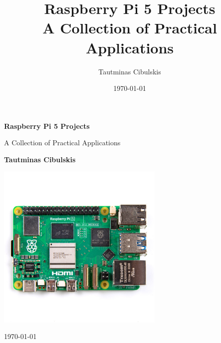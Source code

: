 \documentclass[a4paper,12pt]{article}
\title{\textbf{Raspberry Pi 5 Projects} \\ \Large A Collection of Practical Applications}
\author{Tautminas Cibulskis}
\date{\today}
\begin{document}
\begin{titlepage}
\centering
\vspace*{2cm}
{\Huge \textbf{Raspberry Pi 5 Projects} \par}
\vspace{0.5cm}
{\Large A Collection of Practical Applications\par}
\vspace{2cm}
{\Large \textbf{Tautminas Cibulskis} \par}
\vspace{1.5cm}
\includegraphics[width=0.6\textwidth]{images/raspberry-pi-5.jpg}
\vfill
{\large \today\par}
\end{titlepage}

\renewcommand{\cftsecleader}{\cftdotfill{\cftdotsep}}

\tableofcontents









\end{document}
